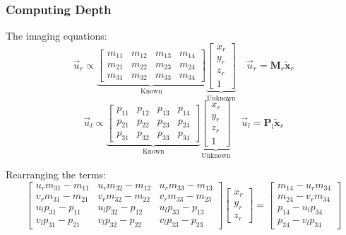 \begin{frame}
    \frametitle{Computing Depth}
    The imaging equations:
    $$
    \vec{u}_r \propto
    \underbrace{\begin{bmatrix}
        m_{11} & m_{12} & m_{13} & m_{14} \\
        m_{21} & m_{22} & m_{23} & m_{24} \\
        m_{31} & m_{32} & m_{33} & m_{34}
    \end{bmatrix}}_{\text{Known}}
    \underbrace{\begin{bmatrix} x_r \\ y_r \\ z_r \\ 1 \end{bmatrix}}_{\text{Unknown}}
    \quad \vec{u}_r = \mathbf{M}_r \tilde{\mathbf{x}}_r
    $$
    $$
    \vec{u}_l \propto
    \underbrace{\begin{bmatrix}
        p_{11} & p_{12} & p_{13} & p_{14} \\
        p_{21} & p_{22} & p_{23} & p_{24} \\
        p_{31} & p_{32} & p_{33} & p_{34}
    \end{bmatrix}}_{\text{Known}}
    \underbrace{\begin{bmatrix} x_r \\ y_r \\ z_r \\ 1 \end{bmatrix}}_{\text{Unknown}}
    \quad \vec{u}_l = \mathbf{P}_l \tilde{\mathbf{x}}_r
    $$

    Rearranging the terms:
    $$
    \begin{bmatrix}
        u_r m_{31} - m_{11} & u_r m_{32} - m_{12} & u_r m_{33} - m_{13} \\
        v_r m_{31} - m_{21} & v_r m_{32} - m_{22} & v_r m_{33} - m_{23} \\
        u_l p_{31} - p_{11} & u_l p_{32} - p_{12} & u_l p_{33} - p_{13} \\
        v_l p_{31} - p_{21} & v_l p_{32} - p_{22} & v_l p_{33} - p_{23}
    \end{bmatrix}
    \begin{bmatrix} x_r \\ y_r \\ z_r \end{bmatrix} =
    \begin{bmatrix}
        m_{14} - u_r m_{34} \\
        m_{24} - v_r m_{34} \\
        p_{14} - u_l p_{34} \\
        p_{24} - v_l p_{34}
    \end{bmatrix}
    $$
\end{frame}

